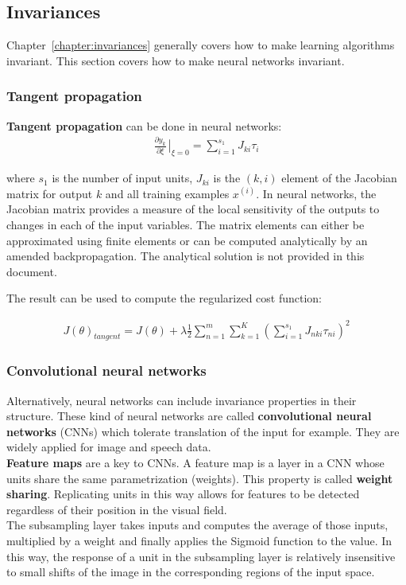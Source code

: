 \documentclass{report}
\begin{document}
\subsection{Invariances}
\label{chapter:nninvariances}
Chapter~\ref{chapter:invariances} generally covers how to make learning algorithms invariant. This section covers how to make neural networks invariant.
\\
\subsubsection{Tangent propagation}
{\bf Tangent propagation} can be done in neural networks:
\begin{align*}
\frac{\partial y_k}{\partial \xi}\left.{\!\!\frac{}{}}\right |_{\xi=0} = \sum_{i=1}^{s_1} J_{ki}\tau_{i}
\end{align*}

where $s_1$ is the number of input units, $J_{ki}$ is the $(k,i)$ element of the Jacobian matrix for output $k$ and all training examples $x^{(i)}$.
In neural networks, the Jacobian matrix provides a measure of the local sensitivity of the outputs to changes in each of the input variables.
The matrix elements can either be approximated using finite elements or can be computed analytically by an amended backpropagation.
The analytical solution is not provided in this document.

The result can be used to compute the regularized cost function:

\begin{align*}
J(\theta)_{tangent} = J(\theta) + \lambda \frac{1}{2} \sum_{n=1}^{m} \sum_{k=1}^{K} (\sum_{i=1}^{s_1} J_{nki}\tau_{ni})^2
\end{align*}

\subsubsection{Convolutional neural networks}
Alternatively, neural networks can include invariance properties in their structure.
These kind of neural networks are called {\bf convolutional neural networks} (CNNs) which tolerate translation of the input for example.
They are widely applied for image and speech data. \\
{\bf Feature maps} are a key to CNNs. A feature map is a layer in a CNN whose units share the same parametrization (weights). This property is called {\bf weight sharing}.
Replicating units in this way allows for features to be detected regardless of their position in the visual field.\\
The subsampling layer takes inputs and computes the average of those inputs, multiplied by a weight and finally applies the Sigmoid function to the value.
In this way, the response of a unit in the subsampling layer is relatively insensitive to small shifts of the image in the corresponding regions of the input space.
\end{document}
